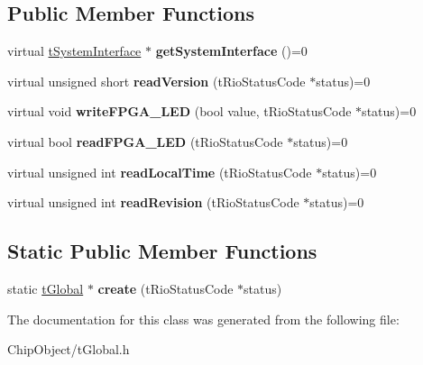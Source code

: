 \subsection*{Public Member Functions}
\begin{DoxyCompactItemize}
\item 
\hypertarget{classnFPGA_1_1nFRC__2012__1__6__4_1_1tGlobal_aa77bb72a813045f958fdf4a84a1ef715}{
virtual \hyperlink{classnFPGA_1_1tSystemInterface}{tSystemInterface} $\ast$ {\bfseries getSystemInterface} ()=0}
\label{classnFPGA_1_1nFRC__2012__1__6__4_1_1tGlobal_aa77bb72a813045f958fdf4a84a1ef715}

\item 
\hypertarget{classnFPGA_1_1nFRC__2012__1__6__4_1_1tGlobal_a29ce40f5e624f04f0109cc74ab1593ca}{
virtual unsigned short {\bfseries readVersion} (tRioStatusCode $\ast$status)=0}
\label{classnFPGA_1_1nFRC__2012__1__6__4_1_1tGlobal_a29ce40f5e624f04f0109cc74ab1593ca}

\item 
\hypertarget{classnFPGA_1_1nFRC__2012__1__6__4_1_1tGlobal_a44247202bedcdb6e54615f4448bc04fa}{
virtual void {\bfseries writeFPGA\_\-LED} (bool value, tRioStatusCode $\ast$status)=0}
\label{classnFPGA_1_1nFRC__2012__1__6__4_1_1tGlobal_a44247202bedcdb6e54615f4448bc04fa}

\item 
\hypertarget{classnFPGA_1_1nFRC__2012__1__6__4_1_1tGlobal_a5d421262bddba076de33a584f2fd660e}{
virtual bool {\bfseries readFPGA\_\-LED} (tRioStatusCode $\ast$status)=0}
\label{classnFPGA_1_1nFRC__2012__1__6__4_1_1tGlobal_a5d421262bddba076de33a584f2fd660e}

\item 
\hypertarget{classnFPGA_1_1nFRC__2012__1__6__4_1_1tGlobal_ae945c8e6dd1125aa33a58bb9bfa72480}{
virtual unsigned int {\bfseries readLocalTime} (tRioStatusCode $\ast$status)=0}
\label{classnFPGA_1_1nFRC__2012__1__6__4_1_1tGlobal_ae945c8e6dd1125aa33a58bb9bfa72480}

\item 
\hypertarget{classnFPGA_1_1nFRC__2012__1__6__4_1_1tGlobal_af4d3a94c1dceef90b20bb524d666404a}{
virtual unsigned int {\bfseries readRevision} (tRioStatusCode $\ast$status)=0}
\label{classnFPGA_1_1nFRC__2012__1__6__4_1_1tGlobal_af4d3a94c1dceef90b20bb524d666404a}

\end{DoxyCompactItemize}
\subsection*{Static Public Member Functions}
\begin{DoxyCompactItemize}
\item 
\hypertarget{classnFPGA_1_1nFRC__2012__1__6__4_1_1tGlobal_a8e30ae5641d2d57379f3a73fe693d0b8}{
static \hyperlink{classnFPGA_1_1nFRC__2012__1__6__4_1_1tGlobal}{tGlobal} $\ast$ {\bfseries create} (tRioStatusCode $\ast$status)}
\label{classnFPGA_1_1nFRC__2012__1__6__4_1_1tGlobal_a8e30ae5641d2d57379f3a73fe693d0b8}

\end{DoxyCompactItemize}


The documentation for this class was generated from the following file:\begin{DoxyCompactItemize}
\item 
ChipObject/tGlobal.h\end{DoxyCompactItemize}
